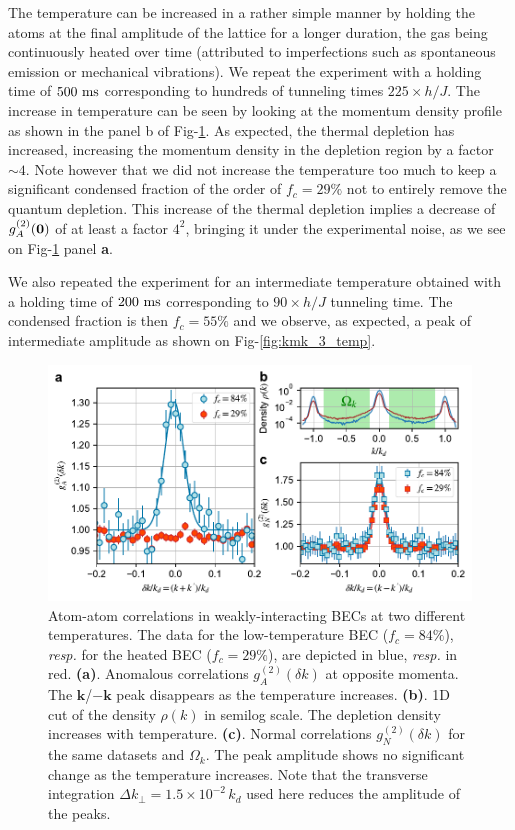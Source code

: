 \label{sec:kmk_temperature}

The temperature can be increased in a rather simple manner by holding the atoms at the final amplitude of the lattice for a longer duration, the gas being continuously heated over time (attributed to imperfections such as spontaneous emission or mechanical vibrations). We repeat the experiment with a holding time of $500 \ \rm{ms}$ corresponding to hundreds of tunneling times $225 \times h/J$. The increase in temperature can be seen by looking at the momentum density profile as shown in the panel b of Fig-\ref{fig:kmk_temperature}. As expected, the thermal depletion has increased, increasing the momentum density in the depletion region by a factor $\sim 4$. Note however that we did not increase the temperature too much to keep a significant condensed fraction of the order of $f_c = 29 \%$ not to entirely remove the quantum depletion. This increase of the thermal depletion implies a decrease of $g^{(2)}_A (\bm{0})$ of at least a factor $4^2$, bringing it under the experimental noise, as we see on Fig-\ref{fig:kmk_temperature} panel \textbf{a}.

We also repeated the experiment for an intermediate temperature obtained with a holding time of $200 \ \rm{ms}$ corresponding to $90 \times h/J$ tunneling time. The condensed fraction is then $f_c=55 \%$ and we observe, as expected, a peak of intermediate amplitude as shown on Fig-\ref{fig:kmk_3_temp}.

\begin{figure}
    \centering
    \includegraphics[width=\textwidth]{Fig/Chapter4/kmk_temperature_error_bars.pdf}
    \caption{Atom-atom correlations in weakly-interacting BECs at two different temperatures. The data for the low-temperature BEC ($f_{c}=84\%$), {\it resp.} for the heated BEC ($f_{c}=29\%$), are depicted in blue, {\it resp.} in red. 
    {\bf (a)}. Anomalous correlations $g_{A}^{(2)}(\delta k)$ at opposite momenta. The ${\bm k}$/$-{\bm k}$ peak disappears as the temperature increases.
    {\bf (b)}. 1D cut of the density $\rho(k)$ in semilog scale. The depletion density increases with temperature.
    {\bf (c)}. Normal correlations $g_{N}^{(2)}(\delta k)$ for the same datasets and $\Omega_k$. The peak amplitude shows no significant change as the temperature increases. Note that the transverse integration $\Delta k_{\perp}=1.5 \times 10^{-2} \, k_d$ used here reduces the amplitude of the peaks.}
    \label{fig:kmk_temperature}
\end{figure}

